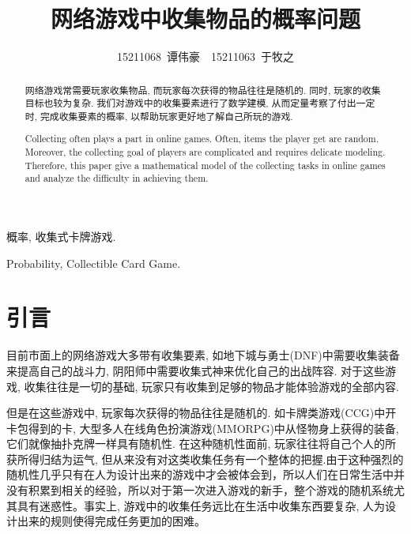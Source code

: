 \documentclass[10pt,journal,compsoc]{IEEEtran}
\begin{document}
\title{网络游戏中收集物品的概率问题}

\author{15211068~谭伟豪~~15211063~于牧之}

\maketitle

\newtheorem{definition}{Definition}
\renewcommand{\abstractname}{摘 要}
\renewcommand{\figurename}{图}
\renewcommand{\tablename}{表}
\renewcommand{\IEEEkeywordsname}{关键词}
\begin{abstract}

  网络游戏常需要玩家收集物品, 而玩家每次获得的物品往往是随机的. 同时, 玩家的收集目标也较为复杂. 我们对游戏中的收集要素进行了数学建模, 从而定量考察了付出一定时, 完成收集要素的概率, 以帮助玩家更好地了解自己所玩的游戏.

\end{abstract}
\renewcommand{\abstractname}{Abstract}
\begin{abstract}
  Collecting often plays a part in online games. Often, items the player get are random. Moreover, the collecting goal of players are complicated and requires delicate modeling. Therefore, this paper give a mathematical model of the collecting tasks in online games and analyze the difficulty in achieving them.
\end{abstract}

\begin{IEEEkeywords}
概率, 收集式卡牌游戏.
\end{IEEEkeywords}
\renewcommand{\IEEEkeywordsname}{Keywords}
\begin{IEEEkeywords}
Probability, Collectible Card Game.
\end{IEEEkeywords}

\section{引言}

  目前市面上的网络游戏大多带有收集要素, 如地下城与勇士(DNF)中需要收集装备来提高自己的战斗力, 阴阳师中需要收集式神来优化自己的出战阵容. 对于这些游戏, 收集往往是一切的基础, 玩家只有收集到足够的物品才能体验游戏的全部内容.

  但是在这些游戏中, 玩家每次获得的物品往往是随机的. 如卡牌类游戏(CCG)中开卡包得到的卡, 大型多人在线角色扮演游戏(MMORPG)中从怪物身上获得的装备, 它们就像抽扑克牌一样具有随机性. 在这种随机性面前, 玩家往往将自己个人的所获所得归结为运气, 但从来没有对这类收集任务有一个整体的把握.由于这种强烈的随机性几乎只有在人为设计出来的游戏中才会被体会到，所以人们在日常生活中并没有积累到相关的经验，所以对于第一次进入游戏的新手，整个游戏的随机系统尤其具有迷惑性。事实上, 游戏中的收集任务远比在生活中收集东西要复杂, 人为设计出来的规则使得完成任务更加的困难。
\end{document}

